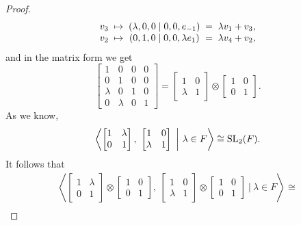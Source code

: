 \begin{proof}
\begin{equation*}
\begin{array}{r@{\;\;}c@{\;\;}c@{\;\;}c@{\;\;}l}
			v_3 & \mapsto & (\lambda,0,0 \mid 0,0,e_{-1}) & = & \lambda v_1 + v_3, \\
			v_2 & \mapsto & (0,1,0 \mid 0,0,\lambda e_1) & = & \lambda v_4 + v_2,
		\end{array}
	\end{equation*}
	and in the matrix form we get
	\begin{equation*}
		\begin{bmatrix}
			1 & 0 & 0 & 0 \\
			0 & 1 & 0 & 0 \\
			\lambda & 0 & 1 & 0 \\
			0 & \lambda & 0 & 1
		\end{bmatrix} = 
		\begin{bmatrix}
			1 & 0 \\
			\lambda & 1
		\end{bmatrix} \otimes
		\begin{bmatrix}
			1 & 0 \\
			0 & 1
		\end{bmatrix}.
	\end{equation*}	
	As we know, 
	\begin{equation*}
		\left\langle
			\begin{bmatrix}
				1 & \lambda \\
				0 & 1
			\end{bmatrix},\ 
			\begin{bmatrix}
				1 & 0 \\
				\lambda & 1
			\end{bmatrix}\ 
			\bigg|
			\ 
			\lambda \in F
		\right\rangle \cong \SL_2(F).
	\end{equation*}
	It follows that
	\begin{multline*}
		\left\langle
			\begin{bmatrix}
				1 & \lambda \\
				0 & 1
			\end{bmatrix} \otimes
			\begin{bmatrix}
				1 & 0 \\
				0 & 1
			\end{bmatrix},\ 
			\begin{bmatrix}
				1 & 0 \\
				\lambda & 1
			\end{bmatrix}\otimes
			\begin{bmatrix}
				1 & 0 \\
				0 & 1
			\end{bmatrix}\ 
			\bigg|
			\ 
			\lambda \in F
		\right\rangle \cong \\

\end{multline*}
\end{proof}
